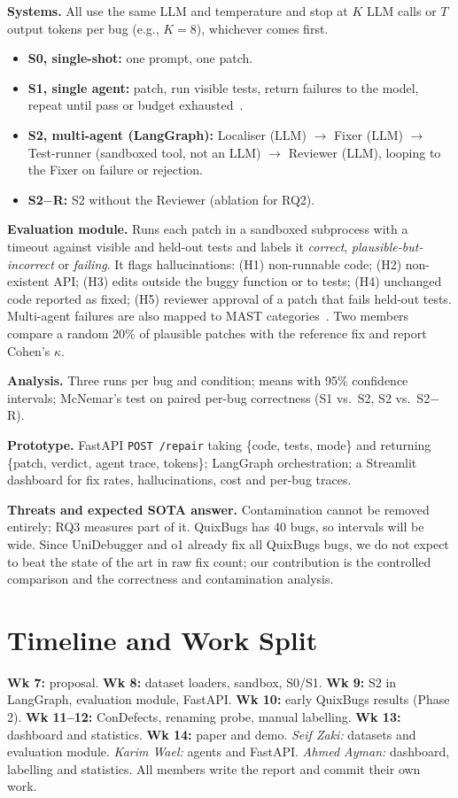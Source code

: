 \documentclass[conference]{IEEEtran}
\begin{document}
\textbf{Systems.} All use the same LLM and temperature and stop at $K$ LLM
calls or $T$ output tokens per bug (e.g., $K=8$), whichever comes first.
\begin{itemize}
\item \textbf{S0, single-shot:} one prompt, one patch.
\item \textbf{S1, single agent:} patch, run visible tests, return failures to
the model, repeat until pass or budget exhausted~\cite{selfdebug}.
\item \textbf{S2, multi-agent (LangGraph):} Localiser (LLM) $\rightarrow$ Fixer
(LLM) $\rightarrow$ Test-runner (sandboxed tool, not an LLM) $\rightarrow$
Reviewer (LLM), looping to the Fixer on failure or rejection.
\item \textbf{S2$-$R:} S2 without the Reviewer (ablation for RQ2).
\end{itemize}

\textbf{Evaluation module.} Runs each patch in a sandboxed subprocess with a
timeout against visible and held-out tests and labels it \emph{correct},
\emph{plausible-but-incorrect} or \emph{failing}. It flags hallucinations:
(H1) non-runnable code; (H2) non-existent API; (H3) edits outside the buggy
function or to tests; (H4) unchanged code reported as fixed; (H5) reviewer
approval of a patch that fails held-out tests. Multi-agent failures are also
mapped to MAST categories~\cite{mast}. Two members compare a random 20\% of
plausible patches with the reference fix and report Cohen's $\kappa$.

\textbf{Analysis.} Three runs per bug and condition; means with 95\% confidence
intervals; McNemar's test on paired per-bug correctness (S1 vs.\ S2, S2 vs.\
S2$-$R).

\textbf{Prototype.} FastAPI \texttt{POST /repair} taking \{code, tests, mode\}
and returning \{patch, verdict, agent trace, tokens\}; LangGraph orchestration;
a Streamlit dashboard for fix rates, hallucinations, cost and per-bug traces.

\textbf{Threats and expected SOTA answer.} Contamination cannot be removed
entirely; RQ3 measures part of it. QuixBugs has 40 bugs, so intervals will be
wide. Since UniDebugger and o1 already fix all QuixBugs bugs, we do not expect
to beat the state of the art in raw fix count; our contribution is the
controlled comparison and the correctness and contamination analysis.

\section{Timeline and Work Split}
\textbf{Wk 7:} proposal. \textbf{Wk 8:} dataset loaders, sandbox, S0/S1.
\textbf{Wk 9:} S2 in LangGraph, evaluation module, FastAPI.
\textbf{Wk 10:} early QuixBugs results (Phase 2).
\textbf{Wk 11--12:} ConDefects, renaming probe, manual labelling.
\textbf{Wk 13:} dashboard and statistics. \textbf{Wk 14:} paper and demo.
\emph{Seif Zaki:} datasets and evaluation module. \emph{Karim Wael:} agents and
FastAPI. \emph{Ahmed Ayman:} dashboard, labelling and statistics. All members
write the report and commit their own work.
\end{document}
